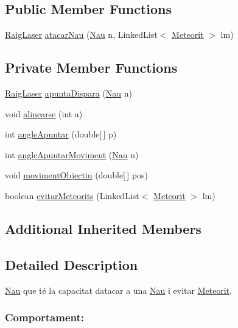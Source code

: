 \subsection*{Public Member Functions}
\begin{DoxyCompactItemize}
\item 
\hyperlink{class_raig_laser}{Raig\+Laser} \hyperlink{class_nau_enemiga_a2a5186aec773bd4015427a92b073e7e7}{atacar\+Nau} (\hyperlink{class_nau}{Nau} n, Linked\+List$<$ \hyperlink{class_meteorit}{Meteorit} $>$ lm)
\end{DoxyCompactItemize}
\subsection*{Private Member Functions}
\begin{DoxyCompactItemize}
\item 
\hyperlink{class_raig_laser}{Raig\+Laser} \hyperlink{class_nau_enemiga_a645365e0a3c5eb29cf31d56dcb76120f}{apunta\+Dispara} (\hyperlink{class_nau}{Nau} n)
\item 
void \hyperlink{class_nau_enemiga_a1ffe6a0da4d399be284a7901a9c5d99f}{alinearse} (int a)
\item 
int \hyperlink{class_nau_enemiga_a02842fe904d67a4ff7b55d5606a30f91}{angle\+Apuntar} (double\mbox{[}$\,$\mbox{]} p)
\item 
int \hyperlink{class_nau_enemiga_a2c21f20dc2290a11315bdd16328815c7}{angle\+Apuntar\+Moviment} (\hyperlink{class_nau}{Nau} n)
\item 
void \hyperlink{class_nau_enemiga_a293dc01f263e42b1b0125e30bf634a18}{moviment\+Objectiu} (double\mbox{[}$\,$\mbox{]} pos)
\item 
boolean \hyperlink{class_nau_enemiga_ac93ff33b14f809511681cc190a74158a}{evitar\+Meteorits} (Linked\+List$<$ \hyperlink{class_meteorit}{Meteorit} $>$ lm)
\end{DoxyCompactItemize}
\subsection*{Additional Inherited Members}


\subsection{Detailed Description}
\hyperlink{class_nau}{Nau} que té la capacitat d\textquotesingle{}atacar a una \hyperlink{class_nau}{Nau} i evitar \hyperlink{class_meteorit}{Meteorit}. 

\subsubsection*{Comportament\+: }

